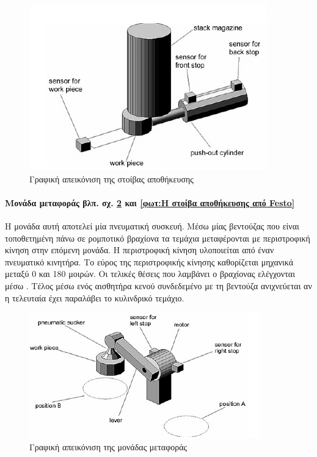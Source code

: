 \documentclass[a4paper,12pt,twoside]{report}
\begin{document}
{				\begin{figure}[hp]
					\centering
					\includegraphics[scale=0.7]{StackModulePartsThrambo.png}
					\caption{Γραφική απεικόνιση της στοίβας αποθήκευσης \cite{ΤοΦυσικόΣύστημαFestoMPS}}
					\label{φωτ:Η στοίβα αποθήκευσης από Θράμπο}
				\end{figure}
	
				\paragraph{Μονάδα μεταφοράς {\footnotesize βλπ. σχ. \ref{φωτ:Η μονάδα μεταφοράς από Θράμπο} και \ref{φωτ:Η στοίβα αποθήκευσης από Festo}}} {Η μονάδα αυτή αποτελεί μία πνευματική συσκευή. Μέσω μίας βεντούζας που είναι τοποθετημένη πάνω σε ρομποτικό βραχίονα τα τεμάχια μεταφέρονται με περιστροφική κίνηση στην επόμενη μονάδα. Η περιστροφική κίνηση υλοποιείται από έναν πνευματικό κινητήρα. Το εύρος της περιστροφικής κίνησης καθορίζεται μηχανικά μεταξύ 0 και 180 μοιρών. Οι τελικές θέσεις που λαμβάνει ο βραχίονας ελέγχονται μέσω . Τέλος μέσω ενός αισθητήρα κενού συνδεδεμένο με τη βεντούζα ανιχνεύεται αν η τελευταία έχει παραλάβει το κυλινδρικό τεμάχιο.
				}
				\begin{figure}[hp]
					\centering
					\includegraphics[scale=0.7]{ChangerModulePartsThrambo.png}
					\caption{Γραφική απεικόνιση της μονάδας μεταφοράς \cite{ΤοΦυσικόΣύστημαFestoMPS}}
					\label{φωτ:Η μονάδα μεταφοράς από Θράμπο}
				\end{figure}
				
}
\end{document}
